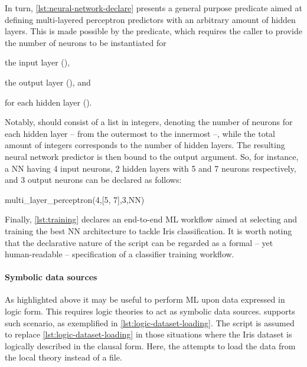 \documentclass{article}
\begin{document}
In turn, \cref{lst:neural-network-declare} presents a general purpose predicate aimed at defining multi-layered perceptron predictors with an arbitrary amount of hidden layers.
%
This is made possible by the  predicate, which requires the caller to provide the number of neurons to be instantiated for
%
\begin{inlinelist}
    \item the input layer (),
    \item the output layer (), and
    \item for each hidden layer ().
\end{inlinelist}
%
Notably,  should consist of a list in integers, denoting the number of neurons for each hidden layer -- from the outermost to the innermost --, while the total amount of integers corresponds to the number of hidden layers.
%
The resulting neural network predictor is then bound to the  output argument.
%
So, for instance, a NN having 4 input neurons, 2 hidden layers with 5 and 7 neurons respectively, and 3 output neurons can be declared as follows:
%
\begin{lp}
    multi\_layer\_perceptron(4,[5, 7],3,NN)
\end{lp}

Finally, \cref{lst:training} declares an end-to-end ML workflow aimed at selecting and training the best NN architecture to tackle Iris classification.
%
It is worth noting that the declarative nature of the script can be regarded as a formal -- yet human-readable -- specification of a classifier training workflow.

\paragraph{Symbolic data sources}

As highlighted above it may be useful to perform ML upon data expressed in logic form.
%
This requires logic theories to act as symbolic data sources.
%
\mllib{} supports such scenario, as exemplified in \cref{lst:logic-dataset-loading}.
%
The script is assumed to replace \cref{lst:logic-dataset-loading} in those situations where the Iris dataset is logically described in the clausal form.
%
Here, the  attempts to load the data from the local theory instead of a file.

\end{document}
